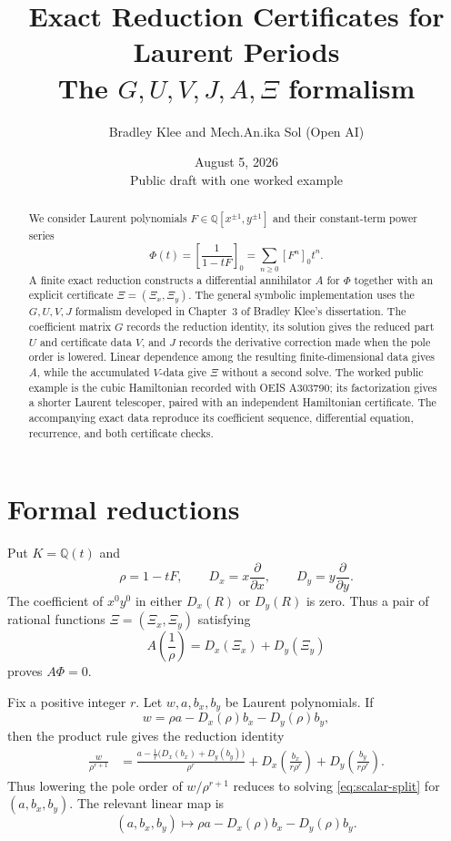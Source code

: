\documentclass[11pt]{article}
\title{Exact Reduction Certificates for Laurent Periods\\[1mm]
\large The $G,U,V,J,A,\Xi$ formalism}
\author{Bradley Klee and Mech.An.ika Sol (Open AI)}
\date{August 5, 2026\\Public draft with one worked example}
\newcommand{\Dx}{D_x}
\newcommand{\Dy}{D_y}
\begin{document}
\maketitle

\begin{abstract}
We consider Laurent polynomials
$F\in\mathbb Q[x^{\pm1},y^{\pm1}]$ and their constant-term power series
\[
  \Phi(t)
  =
  \left[\frac{1}{1-tF}\right]_0
  =
  \sum_{n\ge0}[F^n]_0t^n.
\]
A finite exact reduction constructs a differential annihilator $A$ for
$\Phi$ together with an explicit certificate $\Xi=(\Xi_x,\Xi_y)$.
The general symbolic implementation uses the $G,U,V,J$ formalism developed in
Chapter~3 of Bradley Klee's dissertation.  The coefficient matrix $G$
records the reduction identity, its solution gives the reduced part $U$
and certificate data $V$, and $J$ records the derivative correction made
when the pole order is lowered.  Linear dependence among the resulting
finite-dimensional data gives $A$, while the accumulated $V$-data give
$\Xi$ without a second solve.  The worked public example is the cubic
Hamiltonian recorded with OEIS A303790; its factorization gives a shorter
Laurent telescoper, paired with an independent Hamiltonian certificate.  The
accompanying exact data reproduce its coefficient sequence, differential
equation, recurrence, and both certificate checks.
\end{abstract}

\section{Formal reductions}

Put $K=\mathbb Q(t)$ and
\[
  \rho=1-tF,
  \qquad
  \Dx=x\frac{\partial}{\partial x},
  \qquad
  \Dy=y\frac{\partial}{\partial y}.
\]
The coefficient of $x^0y^0$ in either $\Dx(R)$ or $\Dy(R)$ is zero.
Thus a pair of rational functions $\Xi=(\Xi_x,\Xi_y)$ satisfying
\begin{equation}\label{eq:certificate-goal}
  A\!\left(\frac1\rho\right)=\Dx(\Xi_x)+\Dy(\Xi_y)
\end{equation}
proves $A\Phi=0$.

Fix a positive integer $r$.  Let $w,a,b_x,b_y$ be Laurent
polynomials.  If
\begin{equation}\label{eq:scalar-split}
  w=\rho a-\Dx(\rho)b_x-\Dy(\rho)b_y,
\end{equation}
then the product rule gives the reduction identity
\begin{align}
  \frac{w}{\rho^{r+1}}
  &={}
  \frac{a-\frac1r\bigl(\Dx(b_x)+\Dy(b_y)\bigr)}{\rho^r}
  +\Dx\!\left(\frac{b_x}{r\rho^r}\right)
  +\Dy\!\left(\frac{b_y}{r\rho^r}\right).
  \label{eq:scalar-lowering}
\end{align}
Thus lowering the pole order of $w/\rho^{r+1}$ reduces to solving
\eqref{eq:scalar-split} for $(a,b_x,b_y)$.  The relevant linear map is
\begin{equation}\label{eq:coefficient-map}
  (a,b_x,b_y)\longmapsto
  \rho a-\Dx(\rho)b_x-\Dy(\rho)b_y.
\end{equation}
\end{document}
